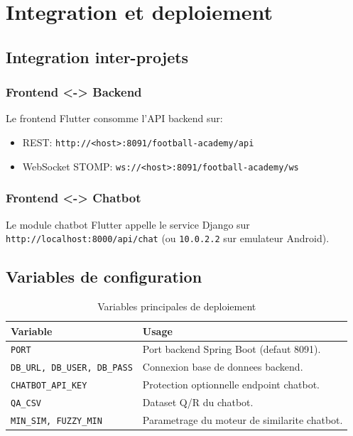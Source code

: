 \chapter{Integration et deploiement}

\section{Integration inter-projets}

\subsection*{Frontend <-> Backend}
Le frontend Flutter consomme l'API backend sur:
\begin{itemize}[leftmargin=*]
  \item REST: \texttt{http://<host>:8091/football-academy/api}
  \item WebSocket STOMP: \texttt{ws://<host>:8091/football-academy/ws}
\end{itemize}

\subsection*{Frontend <-> Chatbot}
Le module chatbot Flutter appelle le service Django sur \texttt{http://localhost:8000/api/chat} (ou \texttt{10.0.2.2} sur emulateur Android).

\section{Variables de configuration}

\begin{table}[H]
\centering
\begin{tabular}{p{} p{}}
\toprule
\textbf{Variable} & \textbf{Usage} \\
\midrule
\texttt{PORT} & Port backend Spring Boot (defaut 8091). \\
\texttt{DB\_URL, DB\_USER, DB\_PASS} & Connexion base de donnees backend. \\
\texttt{CHATBOT\_API\_KEY} & Protection optionnelle endpoint chatbot. \\
\texttt{QA\_CSV} & Dataset Q/R du chatbot. \\
\texttt{MIN\_SIM, FUZZY\_MIN} & Parametrage du moteur de similarite chatbot. \\
\bottomrule
\end{tabular}
\caption{Variables principales de deploiement}
\end{table}

